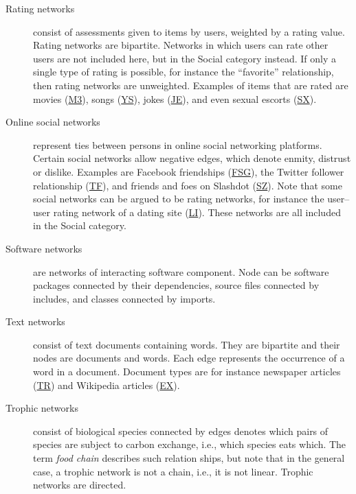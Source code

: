 \documentclass{article}
\begin{document}
\begin{description}
\item[Rating networks] consist of assessments given to items by users,
  weighted by a rating value.  Rating networks are bipartite.  
  Networks in which users can rate other users are not included here,
  but in the Social category instead.  If only a single type of rating
  is possible, for instance the ``favorite'' relationship, then rating
  networks are unweighted.  Examples of items that are rated are movies
  (\href{http://konect.uni-koblenz.de/networks/movielens-10m_rating}{\textsf{M3}}), 
  songs
  (\href{http://konect.uni-koblenz.de/networks/yahoo-song}{\textsf{YS}}),
  jokes
  (\href{http://konect.uni-koblenz.de/networks/jester}{\textsf{JE}}),
  and even sexual escorts
  (\href{http://konect.uni-koblenz.de/networks/escorts}{\textsf{SX}}).   

\item[Online social networks] represent ties between
  persons in online social networking platforms.  Certain social
  networks allow negative edges, which denote 
  enmity, distrust or dislike.
  Examples are Facebook friendships
  (\href{http://konect.uni-koblenz.de/networks/facebook-sg}{\textsf{FSG}}),
  the Twitter follower relationship
  (\href{http://konect.uni-koblenz.de/networks/twitter_mpi}{\textsf{TF}}), 
  and friends and foes on Slashdot
  (\href{http://konect.uni-koblenz.de/networks/slashdot-zoo}{\textsf{SZ}}).  
  Note that some social networks can be argued to be rating networks,
  for instance the 
  user--user rating network of a dating site
  (\href{http://konect.uni-koblenz.de/networks/libimseti}{\textsf{LI}}). 
  These networks are all included in the Social category. 

\item[Software networks] are networks of interacting software
  component.  Node can be software packages connected by their
  dependencies, source files connected by includes, and classes
  connected by imports. 

\item[Text networks] consist of text documents containing words.  They
  are bipartite and their nodes are documents and words.  Each edge
  represents the occurrence of a word in a document. Document types are
  for instance
  newspaper articles
  (\href{http://konect.uni-koblenz.de/networks/gottron-trec}{\textsf{TR}})
  and Wikipedia articles
  (\href{http://konect.uni-koblenz.de/networks/gottron-excellent}{\textsf{EX}}). 

\item[Trophic networks] consist of biological 
  species connected by edges denotes
  which pairs of species are subject to carbon exchange, i.e., which
  species eats which.  The term \emph{food chain} describes such
  relation ships, but note that in the general case, a trophic network
  is not a chain, i.e., it is not linear.  Trophic networks are
  directed. 

\end{description}
\end{document}
